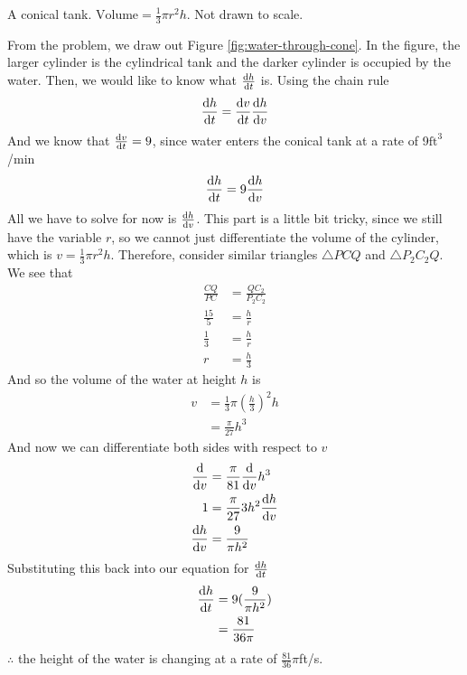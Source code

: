 \documentclass[working]{tuftebook}
\begin{document}
\newpage
\begin{solutions}
\begin{marginfigure}
    \centering
    \caption{A conical tank. $ \text{Volume}= \frac{1}{3}\pi r^2h$. Not drawn to scale.}
    \label{fig:water-through-cone}
\end{marginfigure}

    \item{From the problem, we draw out Figure \ref{fig:water-through-cone}. In the figure, the larger cylinder is the cylindrical tank and the darker cylinder is occupied by the water. Then, we would like to know what $ \dv{h}{t}$ is. Using the chain rule
            \[
                \dv{h}{t}= \dv{v}{t} \dv{h}{v}
            \]
        And we know that $ \dv{v}{t}=9$, since water enters the conical tank at a rate of 9$ \text{ft}^3$/min
        \[
            \dv{h}{t}=9 \dv{h}{v}
        \]
        All we have to solve for now is $ \dv{h}{v}$. This part is a little bit tricky, since we still have the variable $r$, so we cannot just differentiate the volume of the cylinder, which is $v= \frac{1}{3}\pi r^2h$. Therefore, consider similar triangles $\triangle PCQ$ and $\triangle P_2C_2Q$. We see that
        \begin{align*}
            \frac{CQ}{PC}&= \frac{QC_2}{P_2C_2}\\ 
            \frac{15}{5}&= \frac{h}{r}\\ 
            \frac{1}{3}&= \frac{h}{r}\\ 
            r&= \frac{h}{3}
        \end{align*}
        And so the volume of the water at height $h$ is 
        \begin{align*}
            v&= \frac{1}{3}\pi( \frac{h}{3})^2h\\ 
             &= \frac{\pi}{27}h^3
        \end{align*}
        And now we can differentiate both sides with respect to $v$ 
        \begin{align*}
            \dv{}{v}(v)&= \frac{\pi}{81} \dv{}{v}h^3\\ 
            1&= \frac{\pi}{27}3h^2 \dv{h}{v}\\ 
            \dv{h}{v}&= \frac{9}{\pi h^2}
        \end{align*}
        Substituting this back into our equation for $ \dv{h}{t}$
        \begin{align*}
            \dv{h}{t}&=9( \frac{9}{\pi h^2})\\ 
                     &= \frac{81}{36\pi}
        \end{align*}
        $\therefore$ the height of the water is changing at a rate of $ \frac{81}{36}\pi$ft/s. 
        }


\end{solutions}
\end{document}
